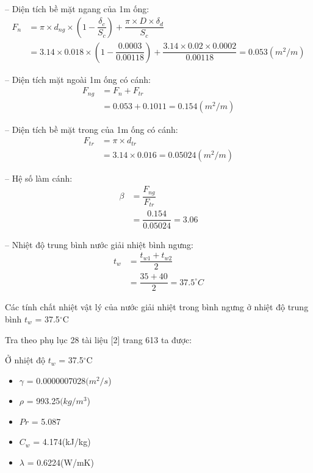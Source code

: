 -- Diện tích bề mặt ngang của 1m ống:
\begin{equation*}
\begin{split}
		F_{n} &= \pi\times d_{ng}\times \left(1-\dfrac{\delta_{c}}{S_{c}}\right) + \dfrac{\pi\times D\times \delta_{d}}{S_{c}}\\
		&= 3.14 \times 0.018 \times (1-\dfrac{0.0003}{0.00118}) + \dfrac{3.14 \times 0.02 \times 0.0002}{0.00118} = 0.053 (m^2/m)
\end{split}
\end{equation*}

-- Diện tích mặt ngoài 1m ống có cánh:
\begin{equation*}
	\begin{split}
		F_{ng} &= F_{n} + F_{tr}\\
		&= 0.053 + 0.1011 = 0.154(m^2/m)
	\end{split}
\end{equation*}

-- Diện tích bề mặt trong của 1m ống có cánh:
\begin{equation*}
	\begin{split}
		F_{tr} &= \pi\times d_{tr}\\
		&= 3.14 \times 0.016 = 0.05024(m^2/m)
	\end{split}
\end{equation*}	

-- Hệ số làm cánh:
\begin{equation*}
	\begin{split}
		\beta &= \dfrac{F_{ng}}{F_{tr}}\\
		&= \dfrac{0.154}{0.05024}= 3.06
	\end{split}
\end{equation*}	

-- Nhiệt độ trung bình nước giải nhiệt bình ngưng:
\begin{equation*}
	\begin{split}
		t_{w} &= \dfrac{t_{w1} + t_{w2}}{2}\\
		&= \dfrac{35 + 40}{2} = 37.5^{\circ}C
	\end{split}
\end{equation*}	

Các tính chất nhiệt vật lý của nước giải nhiệt trong bình ngưng ở nhiệt độ trung bình $t_{w}$ = 37.5$^{\circ}$C

Tra theo phụ lục 28 tài liệu [2] trang 613 ta được:

Ở nhiệt độ $ t_{w} $ = 37.5$^{\circ}$C
\begin{itemize}
	\item $\gamma$ = 0.0000007028$(m^2/s$)
	\item $\rho$ =  993.25$(kg/m^3$)
	\item $Pr$ =  	5.087
	\item $C_{w}$ =  4.174(kJ/kg)	
	\item $\lambda$ = 0.6224(W/mK)
\end{itemize}


